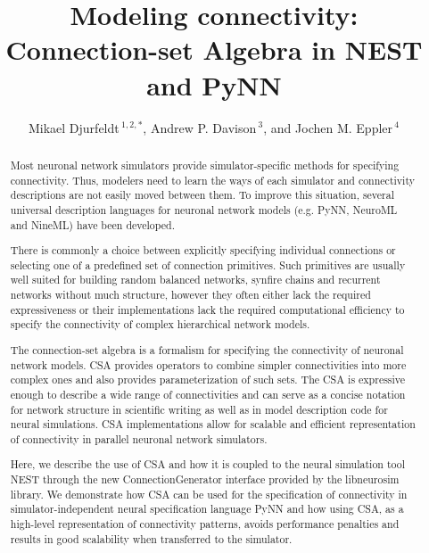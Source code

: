 \documentclass{frontiersSCNS} %
\def\firstAuthorLast{Djurfeldt {et~al.}}
\def\Authors{Mikael Djurfeldt\,$^{1,2,*}$, Andrew P. Davison\,$^{3}$,
 and Jochen M. Eppler\,$^4$}
\begin{document}
\onecolumn
{}

\title[CSA in NEST and PyNN]{Modeling connectivity: Connection-set
 Algebra in NEST and PyNN}
\author[\firstAuthorLast ]{\Authors}
\address{}
\correspondance{}
\extraAuth{}%

\maketitle
\begin{abstract} %

Most neuronal network simulators provide simulator-specific methods
for specifying connectivity. Thus, modelers need to learn the ways of
each simulator and connectivity descriptions are not easily moved
between them.  To improve this situation, several universal description
languages for neuronal network models (e.g. PyNN, NeuroML and NineML)
have been developed.

There is commonly a choice between explicitly specifying individual
connections or selecting one of a predefined set of connection
primitives. Such primitives are usually well suited for building
random balanced networks, synfire chains and recurrent networks
without much structure, however they often either lack the required
expressiveness or their implementations lack the required
computational efficiency to specify the connectivity of complex
hierarchical network models.

The connection-set algebra is a formalism
for specifying the connectivity of neuronal network models. CSA
provides operators to combine simpler connectivities into more complex
ones and also provides parameterization of such sets. The CSA is
expressive enough to describe a wide range of connectivities and can
serve as a concise notation for network structure in scientific
writing as well as in model description code for neural
simulations. CSA implementations allow for scalable and efficient
representation of connectivity in parallel neuronal network
simulators.

Here, we describe the use of CSA and how it is coupled to the neural
simulation tool NEST through the new
ConnectionGenerator interface provided by the libneurosim library. We
demonstrate how CSA can be used for the specification of connectivity
in simulator-independent neural specification language PyNN
and how using CSA, as a high-level representation of
connectivity patterns, avoids performance penalties and results in
good scalability when transferred to the simulator.


\end{abstract}
\end{document}
